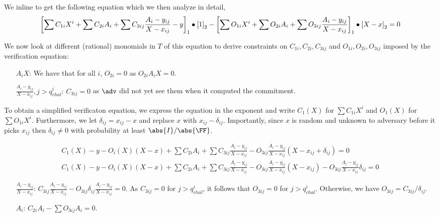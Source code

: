 \documentclass[runningheads,11pt]{llncs}
\begin{document}
We inline to get the following equation which we then analyze in detail,
\begin{align*}
  \left[\sum C_{1i} X^{i} + \sum C_{2i} A_{i} + \sum C_{3ij}
  \frac{A_{i}-y_{ij}}{X-x_{ij}} - y\right]_{1} \bullet \left[1\right]_{2} - \left[\sum O_{1i} X^{i}
  + \sum O_{2i} A_{i} + \sum O_{3ij} \frac{A_{i}-y_{ij}}{X-x_{ij}}\right]_{1} \bullet \left[X -
  x\right]_{2} = 0
\end{align*}

We now look at different (rational) monomials in $T$ of this equation to derive
constraints on $C_{1i}, C_{{2i}},C_{{3ij}}$ and $O_{1i},O_{2i},O_{3ij}$ imposed by
the verification equation:
\begin{itemize}
  \item[$A_{i}X$:] We have that for all $i$, $O_{2i}=0$ as $O_{2i} A_{i} X = 0$.
  \item[$\frac{A_{i}-y_{ij}}{X-x_{ij}}, j>q^{i}_{chal}$:] $C_{3ij}=0$ as $\adv$ did
    not yet see them when it computed the commitment.
\end{itemize}

To obtain a simplified verificaton equation, we express the equation in the exponent
and write $C_{1}(X)$ for $\sum C_{1i} X^{i}$ and $O_{1}(X)$ for $\sum O_{1i} X^{i}$.
Furthermore, we let $\delta_{ij} = x_{i j} - x$ and replace $x$ with
$x_{ij} - \delta_{ij}$. Importantly, since $x$ is random and unknown to adversary
before it picks $x_{i j}$ then $\delta_{i j} \neq 0$ with probability at least
$\infrac{\abs{I}}{\abs{\FF}}$. 

\begin{align*}
  C_{1}(X) - y - O_{i}(X)(X-x) + \sum C_{2i} A_{i} + \sum C_{3ij} \frac{A_{i}-y_{ij}}{X-x_{ij}} - O_{3ij} \frac{A_{i}-y_{ij}}{X-x_{ij}} (X-x_{ij}+\delta_{ij}) = 0\\
  C_{1}(X) - y - O_{i}(X)(X-x) + \sum C_{2i} A_{i} + \sum C_{3ij} \frac{A_{i}-y_{ij}}{X-x_{ij}} - O_{3ij} \frac{A_{i}-y_{ij}}{X-x_{ij}} (X-x_{ij}) - O_{3ij} \frac{A_{i}-y_{ij}}{X-x_{ij}} \delta_{ij} = 0
\end{align*}

\begin{itemize}
\item[$\frac{A_{i}-y_{ij}}{X-x_{ij}}$:]
  $C_{3ij} \frac{A_{i}-y_{ij}}{X-x_{ij}} - O_{{3ij}}\delta_{ij}
  \frac{A_{i}-y_{ij}}{X-x_{ij}}=0$. As $C_{3ij}=0$ for $j>q^{i}_{chal}$, it follows
  that $O_{{3ij}}=0$ for $j>q^{i}_{chal}$. Otherwise, we have
  $O_{3ij}= C_{3ij}/\delta_{ij}$.
\item[$A_{i}$:] $C_{2i} A_{i} - \sum O_{3ij} A_{i}=0$.
\end{itemize}
\end{document}
